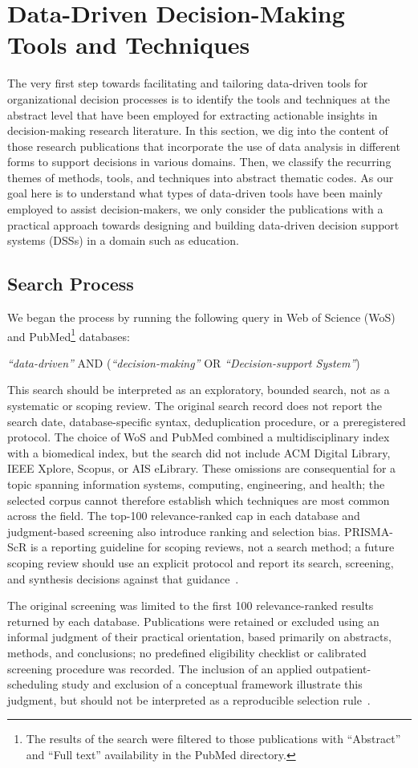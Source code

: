 \documentclass{sfuthesis}
\begin{document}
\section{Data-Driven Decision-Making Tools and Techniques}
The very first step towards facilitating and tailoring data-driven tools for organizational decision processes is to identify the tools and techniques at the abstract level that have been employed for extracting actionable insights in decision-making research literature. In this section, we dig into the content of those research publications that incorporate the use of data analysis in different forms to support decisions in various domains. Then, we classify the recurring themes of methods, tools, and techniques into abstract thematic codes. As our goal here is to understand what types of data-driven tools have been mainly employed to assist decision-makers, we only consider the publications with a practical approach towards designing and building data-driven decision support systems (DSSs) in a domain such as education.
\subsection{Search Process}
We began the process by running the following query in Web of Science (WoS) and PubMed\footnote{The results of the search were filtered to those publications with “Abstract” and “Full text” availability in the PubMed directory.} databases:\par
\begin{center}
\textit{“data-driven”} AND (\textit{“decision-making”} OR \textit{“Decision-support System”})
\end{center}
This search should be interpreted as an exploratory, bounded search, not as a systematic or scoping review. The original search record does not report the search date, database-specific syntax, deduplication procedure, or a preregistered protocol. The choice of WoS and PubMed combined a multidisciplinary index with a biomedical index, but the search did not include ACM Digital Library, IEEE Xplore, Scopus, or AIS eLibrary. These omissions are consequential for a topic spanning information systems, computing, engineering, and health; the selected corpus cannot therefore establish which techniques are most common across the field. The top-100 relevance-ranked cap in each database and judgment-based screening also introduce ranking and selection bias. PRISMA-ScR is a reporting guideline for scoping reviews, not a search method; a future scoping review should use an explicit protocol and report its search, screening, and synthesis decisions against that guidance~\cite{tricco2018prisma}.\par
The original screening was limited to the first 100 relevance-ranked results returned by each database. Publications were retained or excluded using an informal judgment of their practical orientation, based primarily on abstracts, methods, and conclusions; no predefined eligibility checklist or calibrated screening procedure was recorded. The inclusion of an applied outpatient-scheduling study and exclusion of a conceptual framework illustrate this judgment, but should not be interpreted as a reproducible selection rule~\cite{feng2024adaptive,gill_conceptual_2014}.
\end{document}
